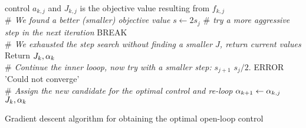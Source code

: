\begin{algorithm}
\begin{algorithmic}
{	control $a_{k,j}$ and $J_{k,j}$ is the objective value resulting from
	$f_{k,j}$}
		\\ {\itshape $\#$ We found a better (smaller) objective value}
		\State $s \gets 2 s_j$ {\itshape $\#$ try a more aggressive step in the
		next iteration}
		\State BREAK
		\EndIf
		\\ {\itshape $\#$ We exhausted the step search without finding a 
		smaller $J$, return current values}
		\State Return $J_k, \alpha_k$
	\EndIf
 	\\ {\itshape  $ \#$ Continue the inner looop, now try with a smaller step:}
	 	\State $s_{j+1}$ \gets $s_j / 2.$
		\State ERROR 'Could not converge'
	\EndIf
    \\{\itshape $\#$ Assign the new candidate for the optimal control and
    re-loop}
		\State $\alpha_{k+1} \gets \alpha_{k,j}$
\State \Return $J_k, \alpha_k$
\end{algorithmic}
\caption{ Gradient descent algorithm for obtaining the optimal open-loop 
control}
\label{alg:gradient_descent_4_OC}
\end{algorithm}



